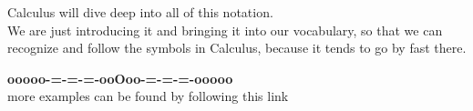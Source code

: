 \documentclass{ximera}
\begin{document}
Calculus will dive deep into all of this notation. \\

We are just introducing it and bringing it into our vocabulary, so that we can recognize and follow the symbols in Calculus, because it tends to go by fast there.



















\begin{onlineOnly}
\begin{center}
\textbf{\textcolor{green!50!black}{ooooo-=-=-=-ooOoo-=-=-=-ooooo}} \\

more examples can be found by following this link\\ 

\end{center}
\end{onlineOnly}
\end{document}
